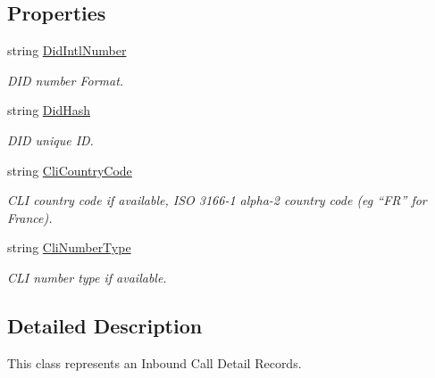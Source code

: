 \subsection*{Properties}
\begin{DoxyCompactItemize}
\item 
string \hyperlink{class_thecallr_api_1_1_objects_1_1_cdr_1_1_cdr_in_a9a877205a0b724cc3864a3f3350f1c71}{Did\+Intl\+Number}
\begin{DoxyCompactList}\small\item\em D\+I\+D number Format. \end{DoxyCompactList}\item 
string \hyperlink{class_thecallr_api_1_1_objects_1_1_cdr_1_1_cdr_in_a7dbf57d93e1de425a7b111a51d6b2a59}{Did\+Hash}
\begin{DoxyCompactList}\small\item\em D\+I\+D unique I\+D. \end{DoxyCompactList}\item 
string \hyperlink{class_thecallr_api_1_1_objects_1_1_cdr_1_1_cdr_in_a9337ea2117de747a64a1c4e4051469c6}{Cli\+Country\+Code}
\begin{DoxyCompactList}\small\item\em C\+L\+I country code if available, I\+S\+O 3166-\/1 alpha-\/2 country code (eg “\+F\+R” for France). \end{DoxyCompactList}\item 
string \hyperlink{class_thecallr_api_1_1_objects_1_1_cdr_1_1_cdr_in_a73d9fda683eda52039acecd97aa96053}{Cli\+Number\+Type}
\begin{DoxyCompactList}\small\item\em C\+L\+I number type if available. \end{DoxyCompactList}\end{DoxyCompactItemize}


\subsection{Detailed Description}
This class represents an Inbound Call Detail Records. 



